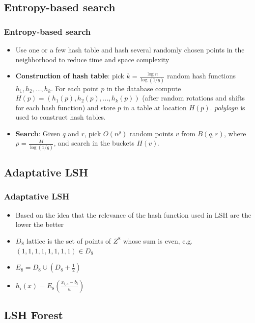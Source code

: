 \subsection{Entropy-based search}
\begin{frame}
\frametitle{Entropy-based search\cite{panigrahy2006entropy}}
\small
\begin{itemize}
	\item Use one or a few hash table and hash several randomly chosen points in the neighborhood to reduce time and space complexity
	\vspace{2ex}
	\item  \textbf{Construction of hash table}: pick $k=\frac{\log n}{\log (1/g)}$ random hash functions $h_1, h_2, ..., h_k$. For each point $p$ in the database compute $H(p)=(h_1(p), h_2(p), ..., h_k(p))$ (\alert{after random rotations and shifts for each hash function}) and store $p$ in a table at location $H(p)$. \textit{polylogn} is used to construct hash tables.
	\vspace{2ex}
	\item \textbf{Search}: Given $q$ and $r$, pick $O(n^\rho)$ random points $v$ from $B(q, r)$, where $\rho=\frac{M}{\log(1/g)}$, and search in the buckets $H(v)$.
\end{itemize}
\end{frame}
\subsection{Adaptative LSH}
\begin{frame}
\frametitle{Adaptative LSH\cite{jegou2008query}}
\small
\begin{itemize}
	\item Based on the idea that the relevance of the hash function used in LSH are the lower the better
	\vspace{2ex}
	\item $D_8$ lattice is the set of points of $Z^8$ whose sum is even, e.g. $(1,1,1,1,1,1,1,1)\in D_8$
	\vspace{2ex}
	\item $E_8=D_8\cup (D_8+\frac{1}{2})$
	\vspace{2ex}
	\item $h_i(x)=E_8(\frac{x_{i,8}-b_i}{w})$
\end{itemize}
\end{frame}
\subsection{LSH Forest}

